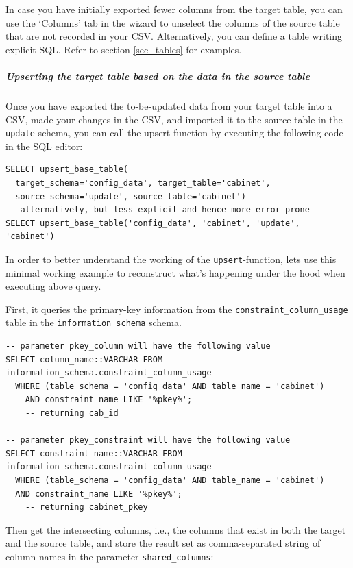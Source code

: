In case you have initially exported fewer columns from the target table, you can use the `Columns' tab in the wizard to unselect the columns of the source table that are not recorded in your CSV.
Alternatively, you can define a table writing explicit SQL. Refer to section \ref{sec_tables} for examples. 

\subparagraph{Upserting the target table based on the data in the source table}

Once you have exported the to-be-updated data from your target table into a CSV, made your changes in the CSV, and imported it to the source table in the \texttt{update} schema, you can call the upsert function by executing the following code in the SQL editor:

\begin{lstlisting}[language=postgreSQL]
SELECT upsert_base_table(
  target_schema='config_data', target_table='cabinet',
  source_schema='update', source_table='cabinet')
-- alternatively, but less explicit and hence more error prone
SELECT upsert_base_table('config_data', 'cabinet', 'update', 'cabinet')
\end{lstlisting}

In order to better understand the working of the \texttt{upsert}-function, lets use this minimal working example to reconstruct what's happening under the hood when executing above query.

First, it queries the primary-key information from the \texttt{constraint\_column\_usage} table in the \texttt{information\_schema} schema.

\begin{lstlisting}[language=postgreSQL]
-- parameter pkey_column will have the following value
SELECT column_name::VARCHAR FROM information_schema.constraint_column_usage 
  WHERE (table_schema = 'config_data' AND table_name = 'cabinet')
	AND constraint_name LIKE '%pkey%';
	-- returning cab_id
	
-- parameter pkey_constraint will have the following value
SELECT constraint_name::VARCHAR FROM information_schema.constraint_column_usage 
  WHERE (table_schema = 'config_data' AND table_name = 'cabinet')
  AND constraint_name LIKE '%pkey%';
	-- returning cabinet_pkey
\end{lstlisting}

Then get the intersecting columns, i.e., the columns that exist in both the target and the source table, and store the result set as comma-separated string of column names in the parameter \texttt{shared\_columns}:

